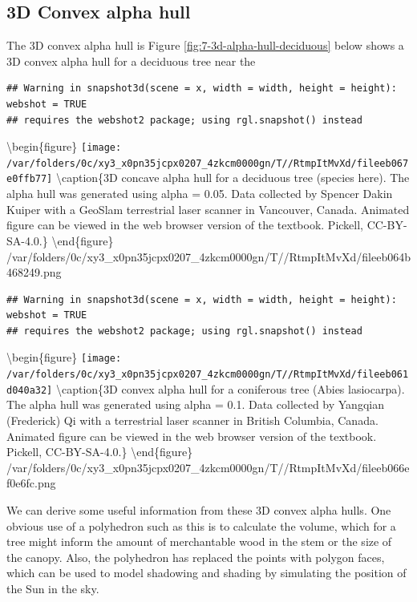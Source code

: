 \documentclass[
]{book}
\begin{document}
\hypertarget{d-convex-alpha-hull}{%
\subsection{3D Convex alpha hull}\label{d-convex-alpha-hull}}

The 3D convex alpha hull is Figure \ref{fig:7-3d-alpha-hull-deciduous} below shows a 3D convex alpha hull for a deciduous tree near the

\begin{verbatim}
## Warning in snapshot3d(scene = x, width = width, height = height): webshot = TRUE
## requires the webshot2 package; using rgl.snapshot() instead
\end{verbatim}

\textbackslash begin\{figure\}
\texttt{[image: /var/folders/0c/xy3\_x0pn35jcpx0207\_4zkcm0000gn/T//RtmpItMvXd/fileeb067e0ffb77]} \textbackslash caption\{3D concave alpha hull for a deciduous tree (species here). The alpha hull was generated using alpha = 0.05. Data collected by Spencer Dakin Kuiper with a GeoSlam terrestrial laser scanner in Vancouver, Canada. Animated figure can be viewed in the web browser version of the textbook. Pickell, CC-BY-SA-4.0.\}\label{fig:7-3d-alpha-hull-deciduous}
\textbackslash end\{figure\}
/var/folders/0c/xy3\_x0pn35jcpx0207\_4zkcm0000gn/T//RtmpItMvXd/fileeb064b468249.png

\begin{verbatim}
## Warning in snapshot3d(scene = x, width = width, height = height): webshot = TRUE
## requires the webshot2 package; using rgl.snapshot() instead
\end{verbatim}

\textbackslash begin\{figure\}
\texttt{[image: /var/folders/0c/xy3\_x0pn35jcpx0207\_4zkcm0000gn/T//RtmpItMvXd/fileeb061d040a32]} \textbackslash caption\{3D convex alpha hull for a coniferous tree (Abies lasiocarpa). The alpha hull was generated using alpha = 0.1. Data collected by Yangqian (Frederick) Qi with a terrestrial laser scanner in British Columbia, Canada. Animated figure can be viewed in the web browser version of the textbook. Pickell, CC-BY-SA-4.0.\}\label{fig:7-3d-alpha-hull-conifer}
\textbackslash end\{figure\}
/var/folders/0c/xy3\_x0pn35jcpx0207\_4zkcm0000gn/T//RtmpItMvXd/fileeb066ef0e6fc.png

We can derive some useful information from these 3D convex alpha hulls. One obvious use of a polyhedron such as this is to calculate the volume, which for a tree might inform the amount of merchantable wood in the stem or the size of the canopy. Also, the polyhedron has replaced the points with polygon faces, which can be used to model shadowing and shading by simulating the position of the Sun in the sky.
\end{document}
